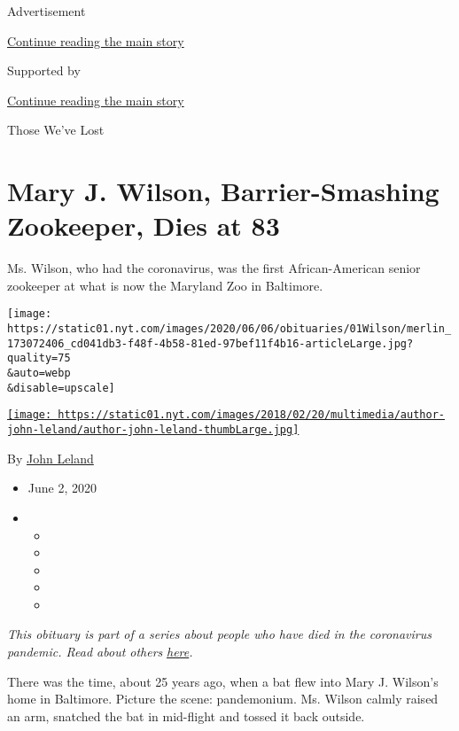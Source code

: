Advertisement

\protect\hyperlink{after-top}{Continue reading the main story}

Supported by

\protect\hyperlink{after-sponsor}{Continue reading the main story}

Those We've Lost

\hypertarget{mary-j-wilson-barrier-smashing-zookeeper-dies-at-83}{%
\section{Mary J. Wilson, Barrier-Smashing Zookeeper, Dies at
83}\label{mary-j-wilson-barrier-smashing-zookeeper-dies-at-83}}

Ms. Wilson, who had the coronavirus, was the first African-American
senior zookeeper at what is now the Maryland Zoo in Baltimore.

\texttt{[image: https://static01.nyt.com/images/2020/06/06/obituaries/01Wilson/merlin\_173072406\_cd041db3-f48f-4b58-81ed-97bef11f4b16-articleLarge.jpg?quality=75\\\&auto=webp\\\&disable=upscale]}

\href{https://www.nytimes.com/by/john-leland}{\texttt{[image: https://static01.nyt.com/images/2018/02/20/multimedia/author-john-leland/author-john-leland-thumbLarge.jpg]}}

By \href{https://www.nytimes.com/by/john-leland}{John Leland}

\begin{itemize}
\item
  June 2, 2020
\item
  \begin{itemize}
  \item
  \item
  \item
  \item
  \item
  \end{itemize}
\end{itemize}

\emph{This obituary is part of a series about people who have died in
the coronavirus pandemic. Read about others}
\href{https://www.nytimes.com/interactive/2020/obituaries/people-died-coronavirus-obituaries.html}{\emph{here}}\emph{.}

There was the time, about 25 years ago, when a bat flew into Mary J.
Wilson's home in Baltimore. Picture the scene: pandemonium. Ms. Wilson
calmly raised an arm, snatched the bat in mid-flight and tossed it back
outside.

